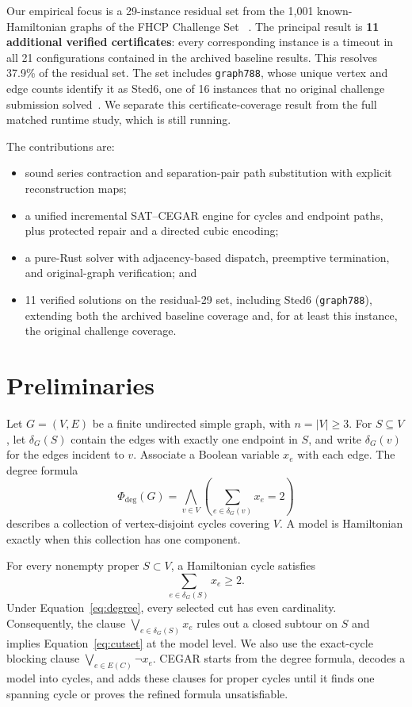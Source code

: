 \documentclass[sigconf,anonymous]{aamas}
\begin{document}
Our empirical focus is a 29-instance residual set from the 1,001
known-Hamiltonian graphs of the FHCP Challenge Set
~\cite{haythorpe2018fhcp}. The principal result is
\textbf{11 additional verified certificates}: every corresponding
instance is a timeout in all 21 configurations contained in the archived
baseline results. This resolves 37.9\% of the residual set. The set
includes \texttt{graph788}, whose unique vertex and edge counts identify
it as Sted6, one of 16 instances that no original challenge submission
solved~\cite{haythorpe2018fhcp,haythorpe2019change}. We separate this
certificate-coverage result from the full matched runtime study, which is
still running.

The contributions are:
\begin{itemize}
  \item sound series contraction and separation-pair path substitution
  with explicit reconstruction maps;
  \item a unified incremental SAT--CEGAR engine for cycles and endpoint
  paths, plus protected repair and a directed cubic encoding;
  \item a pure-Rust solver with adjacency-based dispatch, preemptive
  termination, and original-graph verification; and
  \item 11 verified solutions on the residual-29 set, including Sted6
  (\texttt{graph788}), extending both the archived baseline coverage and,
  for at least this instance, the original challenge coverage.
\end{itemize}

\section{Preliminaries}
\label{sec:preliminaries}

Let $G=(V,E)$ be a finite undirected simple graph, with $n=|V|\geq3$.
For $S\subseteq V$, let $\delta_G(S)$ contain the edges with exactly
one endpoint in $S$, and write $\delta_G(v)$ for the edges incident to
$v$. Associate a Boolean variable $x_e$ with each edge. The degree
formula
\begin{equation}
  \Phi_{\mathrm{deg}}(G)=
  \bigwedge_{v\in V}
  \left(\sum_{e\in\delta_G(v)}x_e=2\right)
  \label{eq:degree}
\end{equation}
describes a collection of vertex-disjoint cycles covering $V$. A model
is Hamiltonian exactly when this collection has one component.

For every nonempty proper $S\subset V$, a Hamiltonian cycle satisfies
\begin{equation}
  \sum_{e\in\delta_G(S)}x_e\geq2.
  \label{eq:cutset}
\end{equation}
Under Equation~\eqref{eq:degree}, every selected cut has even
cardinality. Consequently, the clause
$\bigvee_{e\in\delta_G(S)}x_e$ rules out a closed subtour on $S$ and
implies Equation~\eqref{eq:cutset} at the model level. We also use the
exact-cycle blocking clause
$\bigvee_{e\in E(C)}\neg x_e$. CEGAR starts from the degree formula,
decodes a model into cycles, and adds these clauses for proper cycles
until it finds one spanning cycle or proves the refined formula
unsatisfiable.
\end{document}
